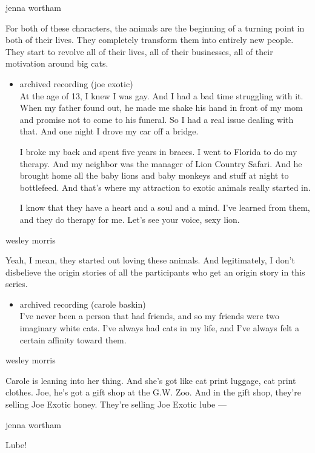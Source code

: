 jenna wortham

For both of these characters, the animals are the beginning of a turning
point in both of their lives. They completely transform them into
entirely new people. They start to revolve all of their lives, all of
their businesses, all of their motivation around big cats.

\begin{itemize}
\item
  archived recording (joe exotic)\\
  At the age of 13, I knew I was gay. And I had a bad time struggling
  with it. When my father found out, he made me shake his hand in front
  of my mom and promise not to come to his funeral. So I had a real
  issue dealing with that. And one night I drove my car off a bridge.

  I broke my back and spent five years in braces. I went to Florida to
  do my therapy. And my neighbor was the manager of Lion Country Safari.
  And he brought home all the baby lions and baby monkeys and stuff at
  night to bottlefeed. And that's where my attraction to exotic animals
  really started in.

  I know that they have a heart and a soul and a mind. I've learned from
  them, and they do therapy for me. Let's see your voice, sexy lion.
\end{itemize}

wesley morris

Yeah, I mean, they started out loving these animals. And legitimately, I
don't disbelieve the origin stories of all the participants who get an
origin story in this series.

\begin{itemize}
\tightlist
\item
  archived recording (carole baskin)\\
  I've never been a person that had friends, and so my friends were two
  imaginary white cats. I've always had cats in my life, and I've always
  felt a certain affinity toward them.
\end{itemize}

wesley morris

Carole is leaning into her thing. And she's got like cat print luggage,
cat print clothes. Joe, he's got a gift shop at the G.W. Zoo. And in the
gift shop, they're selling Joe Exotic honey. They're selling Joe Exotic
lube ---

jenna wortham

Lube!

